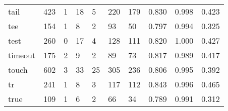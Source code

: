 \begin{longtable}{lp{2.0cm}p{2.0cm}p{2.0cm}p{2.0cm}p{2.0cm}p{2.0cm}p{2.0cm}p{2.0cm}p{2.0cm}}
tail      &                    423 &                                  1 &                                18 &                                5 &                               220 &                             179 &                                   0.830 &                                  0.998 &                                0.423 \\
tee       &                    154 &                                  1 &                                 8 &                                2 &                                93 &                              50 &                                   0.797 &                                  0.994 &                                0.325 \\
test      &                    260 &                                  0 &                                17 &                                4 &                               128 &                             111 &                                   0.820 &                                  1.000 &                                0.427 \\
timeout   &                    175 &                                  2 &                                 9 &                                2 &                                89 &                              73 &                                   0.817 &                                  0.989 &                                0.417 \\
touch     &                    602 &                                  3 &                                33 &                               25 &                               305 &                             236 &                                   0.806 &                                  0.995 &                                0.392 \\
tr        &                    241 &                                  1 &                                 8 &                                3 &                               117 &                             112 &                                   0.843 &                                  0.996 &                                0.465 \\
true      &                    109 &                                  1 &                                 6 &                                2 &                                66 &                              34 &                                   0.789 &                                  0.991 &                                0.312 \\

\end{longtable}
